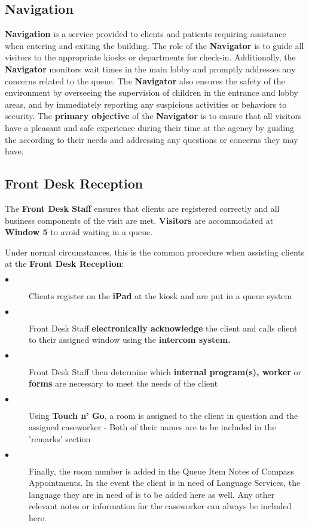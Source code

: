 \documentclass{article}
\begin{document}
\subsection{Navigation}
\textbf{Navigation} is a service provided to clients and patients requiring assistance when entering and exiting the building. The role of the \textbf{Navigator} is to guide all visitors to the appropriate kiosks or departments for check-in. Additionally, the \textbf{Navigator} monitors wait times in the main lobby and promptly addresses any concerns related to the queue. The \textbf{Navigator} also ensures the safety of the environment by overseeing the supervision of children in the entrance and lobby areas, and by immediately reporting any suspicious activities or behaviors to security. The \textbf{primary objective} of the \textbf{Navigator} is to ensure that all visitors have a pleasant and safe experience during their time at the agency by guiding the according to their needs and addressing any questions or concerns they may have.

\subsection{Front Desk Reception}
The \textbf{Front Desk Staff} ensures that clients are registered correctly and all business components of the visit are met. \textbf{Visitors} are accommodated at \textbf{Window 5} to avoid waiting in a queue. 

Under normal circumstances, this is the common procedure when assisting clients at the \textbf{Front Desk Reception}:

\begin{description}
    \item[$\bullet$] Clients register on the \textbf{iPad} at the kiosk and are put in a queue system
    \item[$\bullet$] Front Desk Staff \textbf{electronically acknowledge} the client and calls client to their assigned window using the \textbf{intercom system.}
    \item[$\bullet$] Front Desk Staff then determine which \textbf{internal program(s), worker} or \textbf{forms} are necessary to meet the needs of the client
    \item[$\bullet$] Using \textbf{Touch n' Go}, a room is assigned to the client in question and the assigned caseworker - Both of their names are to be included in the 'remarks' section
    \item[$\bullet$] Finally, the room number is added in the Queue Item Notes of Compass Appointments. In the event the client is in need of Language Services, the language they are in need of is to be added here as well. Any other relevant notes or information for the caseworker can always be included here.
\end{description}
\end{document}
